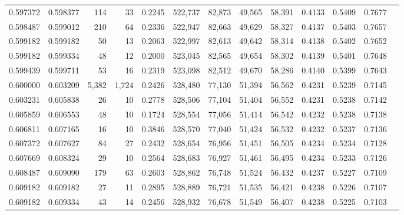 \begin{tabular}{rrrrrrrrrrrrr}
0.597372 & 0.598377 &    114 &    33 &                                     0.2245 & 522,737 &  82,873 &  49,565 &  58,391 & 0.4133 & 0.5409 & 0.7677 \\
0.598487 & 0.599012 &    210 &    64 &                                     0.2336 & 522,947 &  82,663 &  49,629 &  58,327 & 0.4137 & 0.5403 & 0.7657 \\
0.599182 & 0.599182 &     50 &    13 &                                     0.2063 & 522,997 &  82,613 &  49,642 &  58,314 & 0.4138 & 0.5402 & 0.7652 \\
0.599182 & 0.599334 &     48 &    12 &                                     0.2000 & 523,045 &  82,565 &  49,654 &  58,302 & 0.4139 & 0.5401 & 0.7648 \\
0.599439 & 0.599711 &     53 &    16 &                                     0.2319 & 523,098 &  82,512 &  49,670 &  58,286 & 0.4140 & 0.5399 & 0.7643 \\
0.600000 & 0.603209 &  5,382 & 1,724 &                                     0.2426 & 528,480 &  77,130 &  51,394 &  56,562 & 0.4231 & 0.5239 & 0.7145 \\
0.603231 & 0.605838 &     26 &    10 &                                     0.2778 & 528,506 &  77,104 &  51,404 &  56,552 & 0.4231 & 0.5238 & 0.7142 \\
0.605859 & 0.606553 &     48 &    10 &                                     0.1724 & 528,554 &  77,056 &  51,414 &  56,542 & 0.4232 & 0.5238 & 0.7138 \\
0.606811 & 0.607165 &     16 &    10 &                                     0.3846 & 528,570 &  77,040 &  51,424 &  56,532 & 0.4232 & 0.5237 & 0.7136 \\
0.607372 & 0.607627 &     84 &    27 &                                     0.2432 & 528,654 &  76,956 &  51,451 &  56,505 & 0.4234 & 0.5234 & 0.7128 \\
0.607669 & 0.608324 &     29 &    10 &                                     0.2564 & 528,683 &  76,927 &  51,461 &  56,495 & 0.4234 & 0.5233 & 0.7126 \\
0.608487 & 0.609090 &    179 &    63 &                                     0.2603 & 528,862 &  76,748 &  51,524 &  56,432 & 0.4237 & 0.5227 & 0.7109 \\
0.609182 & 0.609182 &     27 &    11 &                                     0.2895 & 528,889 &  76,721 &  51,535 &  56,421 & 0.4238 & 0.5226 & 0.7107 \\
0.609182 & 0.609334 &     43 &    14 &                                     0.2456 & 528,932 &  76,678 &  51,549 &  56,407 & 0.4238 & 0.5225 & 0.7103 \\

\end{tabular}

